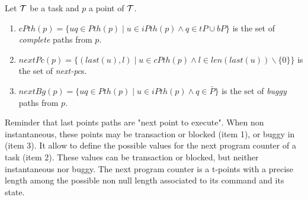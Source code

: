 \documentclass{article}
\begin{document}
\begin{definition}\label{def-nxttr} Let ${\cal T}$ be a task and $p$ a point of ${\cal T}$.
\begin{enumerate}
\item $cPth(p)=\{uq\in Pth(p)\mid u\in iPth(p)\wedge q\in tP\cup bP\}$ is the set of {\em complete} paths from $p$.
\item $nextPc(p)= \{(last(u),l)\mid u\in cPth(p)\wedge l\in len(last(u))\backslash\{0\}\}$ is the set of {\em next-pc}s.
\item $nextBg(p)=\{uq\in Pth(p)\mid u\in iPth(p)\wedge q\in\bar P\}$ is the set of {\em buggy} paths from $p$.
\end{enumerate}
\end{definition}
Reminder that last points paths are "next point to execute". When non instantaneous, these points may be transaction or blocked (item 1), or buggy in (item 3). It allow to define the possible values for the next program counter of a task (item 2). These values can be transaction or blocked, but neither instantaneous nor buggy. The next program counter is a t-points with a precise length among the possible non null length associated to its command and its state. 
\end{document}
